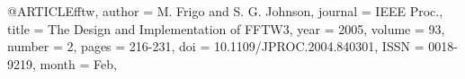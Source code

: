 
@ARTICLE{fftw,
   author = {M. {Frigo} and S. G. {Johnson}},
  journal = {IEEE Proc.},
    title = {The Design and Implementation of FFTW3},
     year = {2005},
   volume = {93},
   number = {2},
    pages = {216-231},
      doi = {10.1109/JPROC.2004.840301},
     ISSN = {0018-9219},
    month = {Feb},
}
